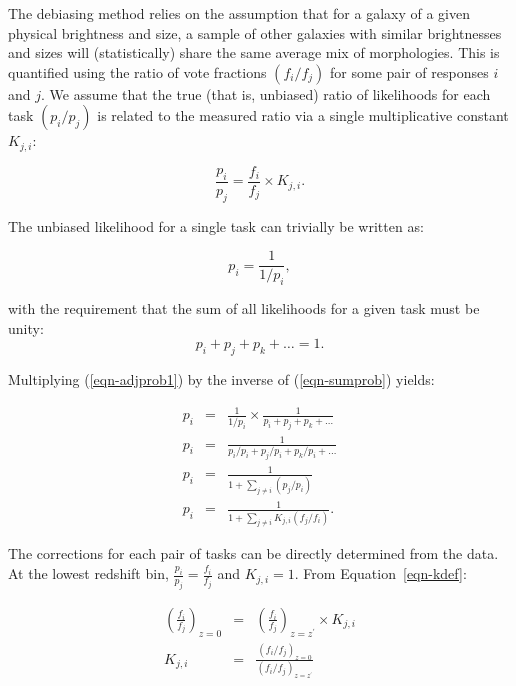 \documentclass[useAMS,usenatbib]{mn2e}
\begin{document}
The debiasing method relies on the assumption that for a galaxy of a given physical brightness and size, a sample of other galaxies with similar brightnesses and sizes will (statistically) share the same average mix of morphologies. This is quantified using the ratio of vote fractions $(f_i/f_j)$ for some pair of responses $i$ and $j$. We assume that the true (that is, unbiased) ratio of likelihoods for each task $(p_i/p_j)$ is related to the measured ratio via a single multiplicative constant $K_{j,i}$:

\begin{equation}
\frac{p_i}{p_j} = \frac{f_i}{f_j}\times K_{j,i}.
\label{eqn-kdef}
\end{equation}

\noindent The unbiased likelihood for a single task can trivially be written as:

\begin{equation}
p_i = \frac{1}{1/p_i},
\label{eqn-adjprob1}
\end{equation}

\noindent with the requirement that the sum of all likelihoods for a given task must be unity:
\begin{equation}
p_i + p_j + p_k + \dots = 1.
\label{eqn-sumprob}
\end{equation}

\noindent Multiplying (\ref{eqn-adjprob1}) by the inverse of (\ref{eqn-sumprob}) yields:

\begin{eqnarray}
p_i &=& \frac{1}{1/p_i} \times \frac{1}{p_i + p_j + p_k + \dots} \\
p_i &=& \frac{1}{p_i/p_i + p_j/p_i + p_k/p_i + \dots} \\
p_i &=& \frac{1}{1 + \sum\limits_{j\ne i}{(p_j/p_i)}} \\
p_i &=& \frac{1}{1 + \sum\limits_{j\ne i}{K_{j,i} (f_j/f_i)}}.
\label{eqnarray-adjprob2}
\end{eqnarray}

The corrections for each pair of tasks can be directly determined from the data. At the lowest redshift bin, $\frac{p_i}{p_j} = \frac{f_i}{f_j}$ and $K_{j,i}=1$. From Equation~\ref{eqn-kdef}:

\begin{eqnarray}
\left(\frac{f_i}{f_j}\right)_{z=0} &=& \left(\frac{f_i}{f_j}\right)_{z=z^\prime}\times K_{j,i} \\
K_{j,i} &=& \frac{\left(f_i/f_j\right)_{z=0} }{ \left(f_i/f_j\right)_{z=z^\prime}}
\label{eqnarray-adjprob3}
\end{eqnarray}
\end{document}
